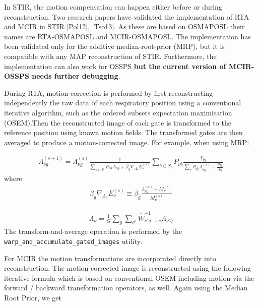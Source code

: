 \documentclass{article}
\begin{document}
In STIR, the motion compensation can happen either before or during reconstruction. Two research papers
have validated the implementation of RTA and MCIR in STIR [Pol12], [Tso13]. As these are based on
OSMAPOSL their names are RTA-OSMAPOSL and MCIR-OSMAPOSL. The implementation has been validated only for
the additive median-root-prior (MRP), but it is compatible with any MAP reconstruction of STIR.
Furthermore, the implementation can also work for OSSPS \textbf{but the current version of MCIR-OSSPS
  needs further debugging}.

During RTA, motion correction is performed by first reconstructing independently the raw data of each
respiratory position using a conventional iterative algorithm, such as the ordered subsets expectation
maximisation (OSEM).Then the reconstructed image of each gate is transformed to the reference position
using known motion fields. The transformed gates are then averaged to produce a motion-corrected image.
For example, when using MRP:

\begin{equation}
\begin{array}{rrr}
\Lambda_{\nu g}^{(s+1)}=\Lambda_{\nu g}^{(s)}\frac{1}{ \sum\limits_{b\in S_{l}}P_{\nu b}A_{bg}+\beta_{g} \nabla_{\Lambda_{\nu}} E_{\nu}^{(s)}}\sum\limits_{b\in S_{l}}P_{\nu b}\frac{Y_{bg}}{\sum\limits_{\tilde{\nu}}P_{b\tilde{\nu}}\Lambda_{\tilde{\nu} g}^{(s)}+\frac{B_{bg}}{A_{bg}}}
\end{array}
\end{equation}
\noindent where
\begin{equation}
\begin{array}{rrr}
\beta_{g} \nabla_{\Lambda_{\nu}} E_{\nu}^{(s)} \equiv \beta_{g}\frac{\Lambda_{{\nu}g}^{(s)}-M_{{\nu}}^{(s)}}{M_{{\nu}}^{(s)}}
\end{array}
\end{equation}

\begin{equation}
\begin{array}{rrr}
\Lambda_{\nu}=\frac{1}{G}\sum\limits_{g}\sum\limits_{\nu'}\hat{W}^{-1} _{\nu'g\rightarrow \nu}\Lambda_{\nu'g}
\end{array}
\end{equation}
The transform-and-average operation is performed by the
\texttt{warp\_and\_accumulate\_gated\_images} utility.

For MCIR the motion transformations are incorporated directly into reconstruction. The motion corrected
image is reconstructed using the following iterative formula which is based on conventional OSEM
including motion via the forward / backward transformation operators, as well. Again using the Median Root Prior, we get
\end{document}
